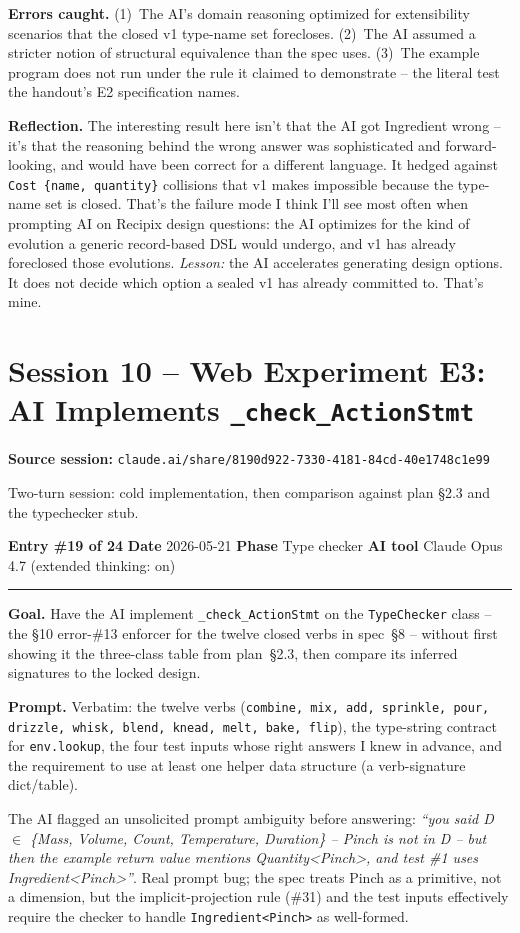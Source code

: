 \documentclass[11pt,a4paper]{article}
\newcommand{\entryheader}[4]{%
    \par\vspace{1em}\noindent\textbf{Entry \#{#1}} \textbullet{} \textbf{Date} #2 \textbullet{} \textbf{Phase} #3 \textbullet{} \textbf{AI tool} #4 \par\vspace{0.3em}\noindent\rule{\textwidth}{0.4pt}\par\vspace{0.3em}}
\newcommand{\sessionheader}[1]{%
    \par\vspace{1.5em}\noindent\textbf{Source session: }\texttt{#1}\par\vspace{0.5em}}
\newcommand{\field}[1]{\noindent\textbf{#1}}
\begin{document}
\field{Errors caught.} (1)~The AI's domain reasoning optimized for
extensibility scenarios that the closed v1 type-name set forecloses.
(2)~The AI assumed a stricter notion of structural equivalence than
the spec uses. (3)~The example program does not run under the rule it
claimed to demonstrate -- the literal test the handout's E2
specification names.

\field{Reflection.} The interesting result here isn't that the AI got
Ingredient wrong -- it's that the reasoning behind the wrong answer
was sophisticated and forward-looking, and would have been correct for
a different language. It hedged against \texttt{Cost \{name, quantity\}}
collisions that v1 makes impossible because the type-name set is
closed. That's the failure mode I think I'll see most often when
prompting AI on Recipix design questions: the AI optimizes for the
kind of evolution a generic record-based DSL would undergo, and v1
has already foreclosed those evolutions. \emph{Lesson:} the AI
accelerates generating design options. It does not decide which
option a sealed v1 has already committed to. That's mine.


\section{Session 10 -- Web Experiment E3: AI Implements \texttt{\_check\_ActionStmt}}

\sessionheader{claude.ai/share/8190d922-7330-4181-84cd-40e1748c1e99}

Two-turn session: cold implementation, then comparison against plan
\S2.3 and the typechecker stub.

\entryheader{19 of 24}{2026-05-21}{Type checker}{Claude Opus 4.7 (extended thinking: on)}

\field{Goal.} Have the AI implement \texttt{\_check\_ActionStmt} on the
\texttt{TypeChecker} class -- the \S10 error-\#13 enforcer for the
twelve closed verbs in spec~\S8 -- without first showing it the
three-class table from plan~\S2.3, then compare its inferred
signatures to the locked design.

\field{Prompt.} Verbatim: the twelve verbs (\texttt{combine, mix, add,
sprinkle, pour, drizzle, whisk, blend, knead, melt, bake, flip}), the
type-string contract for \texttt{env.lookup}, the four test inputs
whose right answers I knew in advance, and the requirement to use at
least one helper data structure (a verb-signature dict/table).

The AI flagged an unsolicited prompt ambiguity before answering:
\emph{``you said D $\in$ \{Mass, Volume, Count, Temperature, Duration\}
-- Pinch is not in D -- but then the example return value mentions
Quantity\textless Pinch\textgreater, and test \#1 uses
Ingredient\textless Pinch\textgreater''}. Real prompt bug; the spec
treats Pinch as a primitive, not a dimension, but the implicit-projection
rule (\#31) and the test inputs effectively require the checker to
handle \texttt{Ingredient<Pinch>} as well-formed.
\end{document}
